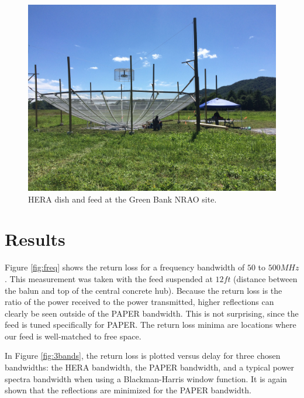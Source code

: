 \documentclass[12pt,preprint]{aastex}
\begin{document}
\begin{figure}
\centering
\includegraphics[trim={2cm 20cm 30cm 15cm},clip, totalheight=0.3\textheight]{plots/heradish.jpg}
\caption{HERA dish and feed at the Green Bank NRAO site.}
\label{fig:heradish}
\end{figure}

\section{Results}

Figure \ref{fig:freq} shows the return loss for a frequency bandwidth of $50$ to $500MHz$. This measurement was taken with the feed suspended at $12ft$ (distance between the balun and top of the central concrete hub). Because the return loss is the ratio of the power received to the power transmitted, higher reflections can clearly be seen outside of the PAPER bandwidth. This is not surprising, since the feed is tuned specifically for PAPER. The return loss minima are locations where our feed is well-matched to free space.

In Figure \ref{fig:3bands}, the return loss is plotted versus delay for three chosen bandwidths: the HERA bandwidth, the PAPER bandwidth, and a typical power spectra bandwidth when using a Blackman-Harris window function. It is again shown that the reflections are minimized for the PAPER bandwidth. 
\end{document}

